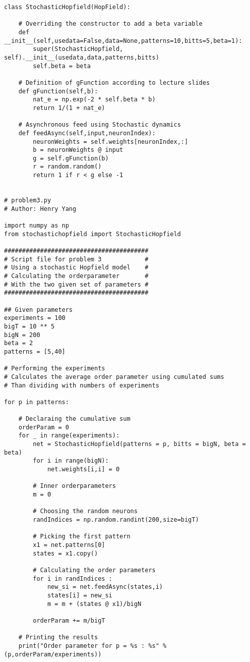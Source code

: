 \documentclass{article}
\begin{document}
\begin{verbatim}
class StochasticHopfield(HopField):

    # Overriding the constructor to add a beta variable
    def __init__(self,usedata=False,data=None,patterns=10,bitts=5,beta=1):
        super(StochasticHopfield, self).__init__(usedata,data,patterns,bitts)
        self.beta = beta
    
    # Definition of gFunction according to lecture slides
    def gFunction(self,b):
        nat_e = np.exp(-2 * self.beta * b)
        return 1/(1 + nat_e)

    # Asynchronous feed using Stochastic dynamics
    def feedAsync(self,input,neuronIndex):
        neuronWeights = self.weights[neuronIndex,:]
        b = neuronWeights @ input
        g = self.gFunction(b)
        r = random.random()
        return 1 if r < g else -1
    

# problem3.py
# Author: Henry Yang

import numpy as np
from stochastichopfield import StochasticHopfield

########################################
# Script file for problem 3            #
# Using a stochastic Hopfield model    #
# Calculating the orderparameter       #
# With the two given set of parameters #
########################################

## Given parameters
experiments = 100
bigT = 10 ** 5
bigN = 200
beta = 2
patterns = [5,40]

# Performing the experiments
# Calculates the average order parameter using cumulated sums
# Than dividing with numbers of experiments

for p in patterns:

    # Declaraing the cumulative sum
    orderParam = 0
    for _ in range(experiments):
        net = StochasticHopfield(patterns = p, bitts = bigN, beta = beta)
        for i in range(bigN):
            net.weights[i,i] = 0

        # Inner orderparameters
        m = 0

        # Choosing the random neurons
        randIndices = np.random.randint(200,size=bigT)
        
        # Picking the first pattern
        x1 = net.patterns[0]
        states = x1.copy()

        # Calculating the order parameters
        for i in randIndices :
            new_si = net.feedAsync(states,i)
            states[i] = new_si
            m = m + (states @ x1)/bigN

        orderParam += m/bigT

    # Printing the results    
    print("Order parameter for p = %s : %s" % (p,orderParam/experiments))

\end{verbatim}
\end{document}
